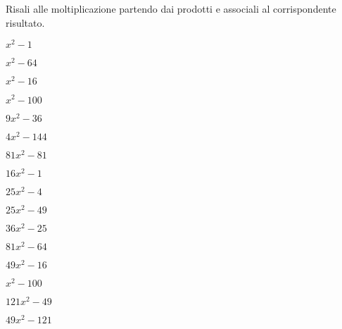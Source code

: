 \begin{esercizio}
\label{ese:11.11}
Risali alle moltiplicazione partendo dai prodotti e associali al 
corrispondente risultato.

\begin{htmulticols}{4}
\begin{enumeratea}
\spazielenx
\item \(x^{2} - 1\) %
\item \(x^{2} - 64\) %
\item \(x^{2} - 16\) %
\item \(x^{2} - 100\) %
\item \(9 x^{2} - 36\) %
\item \(4 x^{2} - 144\) %
\item \(81 x^{2} - 81\) %
\item \(16 x^{2} - 1\) %
\item \(25 x^{2} - 4\) %
\item \(25 x^{2} - 49\) %
\item \(36 x^{2} - 25\) %
\item \(81 x^{2} - 64\) %
\item \(49 x^{2} - 16\) %
\item \(x^{2} - 100\) %
\item \(121 x^{2} - 49\) %
\item \(49 x^{2} - 121\) %

\end{enumeratea}
\end{htmulticols}
\end{esercizio}
